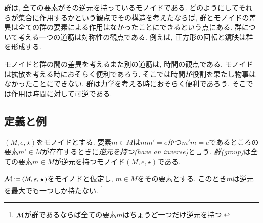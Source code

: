 群は, 全ての要素がその逆元を持っているモノイドである. どのようにしてそれらが集合に作用するかという観点でその構造を考えたならば, 群とモノイドの差異は全ての群の要素による作用はなかったことにできるという点にある. 群について考える一つの道筋は対称性の観点である. 例えば, 正方形の回転と鏡映は群を形成する.


モノイドと群の間の差異を考えるまた別の道筋は, 時間の観点である. モノイドは拡散を考える時におそらく便利であろう. そこでは時間が役割を果たし物事はなかったことにできない. 群は力学を考える時におそらく便利であろう. そこでは作用は時間に対して可逆である.


\subsection{定義と例}

\begin{definition}\label{def:group}


$(M,e,\star)$をモノイドとする. 要素$m\in M$は$mm'=e$かつ$m'm=e$であるところの要素$m'\in M$が存在するときに\emph{逆元を持つ(have an inverse)}と言う. \emph{群(group)}は全ての要素$m\in M$が逆元を持つモノイド$(M,e,\star)$である.

\end{definition}

\begin{proposition}


$\mathcal{M}:=(M,e,\star)$をモイノドと仮定し, $m\in M$をその要素とする. このとき$m$は逆元を最大でも一つしか持たない.
\footnote{$\mathcal{M}$が群であるならば全ての要素$m$はちょうど一つだけ逆元を持つ.}

\end{proposition}

